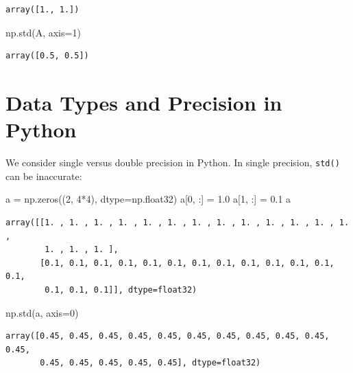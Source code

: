 \documentclass[
  letterpaper,
  DIV=11,
  numbers=noendperiod]{scrreprt}
\newenvironment{Shaded}{\begin{snugshade}}{\end{snugshade}}
\newcommand{\DecValTok}[1]{\textcolor[rgb]{0.68,0.00,0.00}{#1}}
\newcommand{\FloatTok}[1]{\textcolor[rgb]{0.68,0.00,0.00}{#1}}
\newcommand{\NormalTok}[1]{\textcolor[rgb]{0.00,0.23,0.31}{#1}}
\newcommand{\OperatorTok}[1]{\textcolor[rgb]{0.37,0.37,0.37}{#1}}
\begin{document}
\begin{verbatim}
array([1., 1.])
\end{verbatim}

\begin{Shaded}
\begin{Highlighting}[]
\NormalTok{np.std(A, axis}\OperatorTok{=}\DecValTok{1}\NormalTok{)}
\end{Highlighting}
\end{Shaded}

\begin{verbatim}
array([0.5, 0.5])
\end{verbatim}

\section{Data Types and Precision in
Python}\label{data-types-and-precision-in-python}

We consider single versus double precision in Python. In single
precision, \texttt{std()} can be inaccurate:

\begin{Shaded}
\begin{Highlighting}[]
\NormalTok{a }\OperatorTok{=}\NormalTok{ np.zeros((}\DecValTok{2}\NormalTok{, }\DecValTok{4}\OperatorTok{*}\DecValTok{4}\NormalTok{), dtype}\OperatorTok{=}\NormalTok{np.float32)}
\NormalTok{a[}\DecValTok{0}\NormalTok{, :] }\OperatorTok{=} \FloatTok{1.0}
\NormalTok{a[}\DecValTok{1}\NormalTok{, :] }\OperatorTok{=} \FloatTok{0.1}
\NormalTok{a }
\end{Highlighting}
\end{Shaded}

\begin{verbatim}
array([[1. , 1. , 1. , 1. , 1. , 1. , 1. , 1. , 1. , 1. , 1. , 1. , 1. ,
        1. , 1. , 1. ],
       [0.1, 0.1, 0.1, 0.1, 0.1, 0.1, 0.1, 0.1, 0.1, 0.1, 0.1, 0.1, 0.1,
        0.1, 0.1, 0.1]], dtype=float32)
\end{verbatim}

\begin{Shaded}
\begin{Highlighting}[]
\NormalTok{np.std(a, axis}\OperatorTok{=}\DecValTok{0}\NormalTok{)}
\end{Highlighting}
\end{Shaded}

\begin{verbatim}
array([0.45, 0.45, 0.45, 0.45, 0.45, 0.45, 0.45, 0.45, 0.45, 0.45, 0.45,
       0.45, 0.45, 0.45, 0.45, 0.45], dtype=float32)
\end{verbatim}
\end{document}
